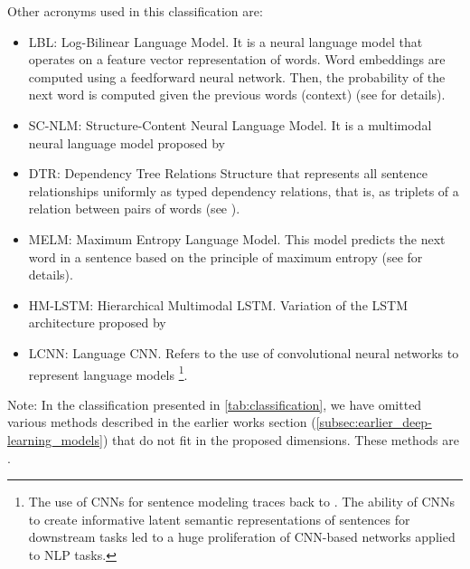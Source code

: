 Other acronyms used in this classification are:
\begin{itemize}
\item LBL: Log-Bilinear Language Model. It is a neural language model that operates on a feature vector representation of words. Word embeddings are computed using a feedforward neural network. Then, the probability of the next word is computed given the previous words (context) (see \citep{Mnih2007} for details).
\item SC-NLM: Structure-Content Neural Language Model. It is a multimodal neural language model proposed by \citep{Kiros2014_VS}
\item DTR: Dependency Tree Relations Structure that represents all sentence relationships uniformly as typed dependency relations, that is, as triplets of a relation between pairs of words (see \citep{DeMarneffe2006}).
\item MELM: Maximum Entropy Language Model. This model predicts the next word in a sentence based on the principle of maximum entropy (see \citep{Berger1996} for details).
\item HM-LSTM: Hierarchical Multimodal LSTM. Variation of the LSTM architecture proposed by \citet{Niu2017}
\item LCNN: Language CNN. Refers to the use of convolutional neural networks to represent language models \footnote{The use of CNNs for sentence modeling traces back to \citet{Collobert2008}. The ability of CNNs to create informative latent semantic representations of sentences for downstream tasks  \citet{Collobert2011, Kalchbrenner2014, Kim2014} led to a huge proliferation of CNN-based networks applied to NLP tasks.}. 
\end{itemize}

Note: In the classification presented in \cref{tab:classification}, we have omitted various methods described in the earlier works section (\cref{subsec:earlier_deep-learning_models}) that do not fit in the proposed dimensions. These methods are \citet{Socher2014, Lebret2015a, Lebret2015b, Yagcioglu2015}.

